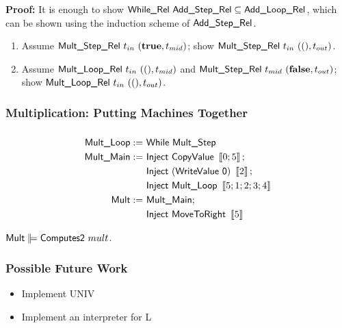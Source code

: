 \documentclass{beamer} %
\begin{document}
\begin{frame}
  \textbf{Proof:}
  It is enough to show $\textsf{While\_Rel}~\textsf{Add\_Step\_Rel} \subseteq \textsf{Add\_Loop\_Rel}$,
  which can be shown using the induction scheme of $\textsf{Add\_Step\_Rel}$.

  \begin{enumerate}
  \item Assume $\textsf{Mult\_Step\_Rel}~t_{in}~(\mathbf{true}, t_{mid})$; show $\textsf{Mult\_Step\_Rel}~t_{in}~(\mathbf{()}, t_{out})$.
  \item Assume $\textsf{Mult\_Loop\_Rel}~t_{in}~(\mathbf{()}, t_{mid})$ and $\textsf{Mult\_Step\_Rel}~t_{mid}~(\mathbf{false}, t_{out})$;
      show $\textsf{Mult\_Loop\_Rel}~t_{in}~(\mathbf{()}, t_{out})$.
  \end{enumerate}

\end{frame}

\begin{frame}
  \frametitle{Multiplication: Putting Machines Together}
  \[
  \]
  \begin{alignat*}{2}
    \textsf{Mult\_Loop} :=~& \textsf{While}~\textsf{Mult\_Step} \\
    \textsf{Mult\_Main} :=~& \textsf{Inject}~\textsf{CopyValue}~\left\llbracket 0;5 \right\rrbracket; \\
                       & \textsf{Inject}~(\textsf{WriteValue~0})~\left\llbracket 2 \right\rrbracket; \\
                       & \textsf{Inject}~\textsf{Mult\_Loop}~\left\llbracket 5;1;2;3;4 \right\rrbracket \\
    \textsf{Mult}       :=~& \textsf{Mult\_Main}; \\
                       & \textsf{Inject}~\textsf{MoveToRight}~\left\llbracket 5 \right\rrbracket
  \end{alignat*}

  \begin{lemma}
    $\MS{Mult} \VDash \MS{Computes2}~mult$. \end{lemma}
  
\end{frame}

\begin{frame}
  \frametitle{Possible Future Work}
  \begin{itemize}
  \item Implement UNIV
  \item Implement an interpreter for L
  \end{itemize}
\end{frame}
\end{document}
